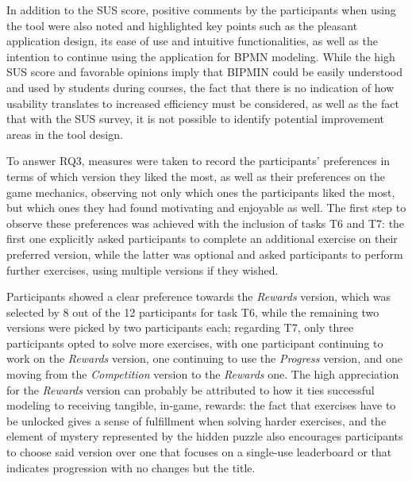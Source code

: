 In addition to the SUS score, positive comments by the participants when using the tool were also noted and highlighted key points such as the pleasant application design, its ease of use and intuitive functionalities, as well as the intention to continue using the application for BPMN modeling. While the high SUS score and favorable opinions imply that BIPMIN could be easily understood and used by students during courses, the fact that there is no indication of how usability translates to increased efficiency must be considered, as well as the fact that with the SUS survey, it is not possible to identify potential improvement areas in the tool design.


To answer RQ3, measures were taken to record the participants' preferences in terms of which version they liked the most, as well as their preferences on the game mechanics, observing not only which ones the participants liked the most, but which ones they had found motivating and enjoyable as well. The first step to observe these preferences was achieved with the inclusion of tasks T6 and T7: the first one explicitly asked participants to complete an additional exercise on their preferred version, while the latter was optional and asked participants to perform further exercises, using multiple versions if they wished. 

Participants showed a clear preference towards the \textit{Rewards} version, which was selected by 8 out of the 12 participants for task T6, while the remaining two versions were picked by two participants each; regarding T7, only three participants opted to solve more exercises, with one participant continuing to work on the \textit{Rewards} version, one continuing to use the \textit{Progress} version, and one moving from the \textit{Competition} version to the \textit{Rewards} one. The high appreciation for the \textit{Rewards} version can probably be attributed to how it ties successful modeling to receiving tangible, in-game, rewards: the fact that exercises have to be unlocked gives a sense of fulfillment when solving harder exercises, and the element of mystery represented by the hidden puzzle also encourages participants to choose said version over one that focuses on a single-use leaderboard or that indicates progression with no changes but the title.

